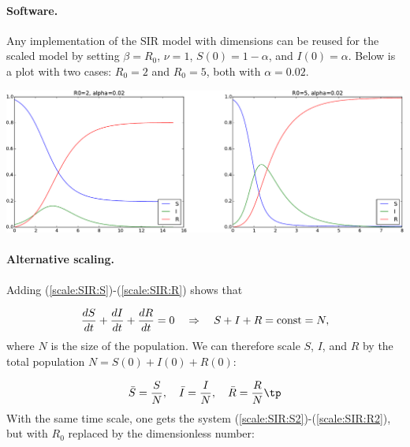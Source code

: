 \documentclass[graybox,envcountchap,sectrefs,final]{svmonodo}
\begin{document}
\paragraph{Software.}
Any implementation of the SIR model with dimensions can be reused for
the scaled model by setting $\beta = R_0$, $\nu = 1$, $S(0)=1-\alpha$,
and $I(0)=\alpha$. Below is a plot with two cases: $R_0=2$ and $R_0=5$,
both with $\alpha=0.02$.



\vspace{3mm}




\vspace{3mm}





\centerline{\includegraphics[width=1.0\linewidth]{fig-scaling/SIR1.pdf}}





\vspace{3mm}




\vspace{3mm}




\paragraph{Alternative scaling.}
Adding (\ref{scale:SIR:S})-(\ref{scale:SIR:R}) shows that

\[ \frac{dS}{dt}+\frac{dI}{dt}+\frac{dR}{dt}=0\quad\Rightarrow\quad
S+I+R=\hbox{const}=N,\]
where $N$ is the size of the population.
We can therefore scale $S$, $I$, and $R$ by the total
population $N=S(0)+I(0)+R(0)$:

\[ \bar S = \frac{S}{N},\quad \bar I = \frac{I}{N},\quad
\bar R = \frac{R}{N}\tp
\]
With the same time scale, one gets the system (\ref{scale:SIR:S2})-(\ref{scale:SIR:R2}), but with $R_0$ replaced by the dimensionless number:
\end{document}
